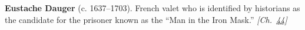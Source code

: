 \textbf{Eustache Dauger} (c. 1637–1703). French valet who is identified by historians as the candidate for the prisoner known as the ``Man in the Iron Mask.'' \emph{[Ch.~\hyperref[ch:ironmask]{44}]}

